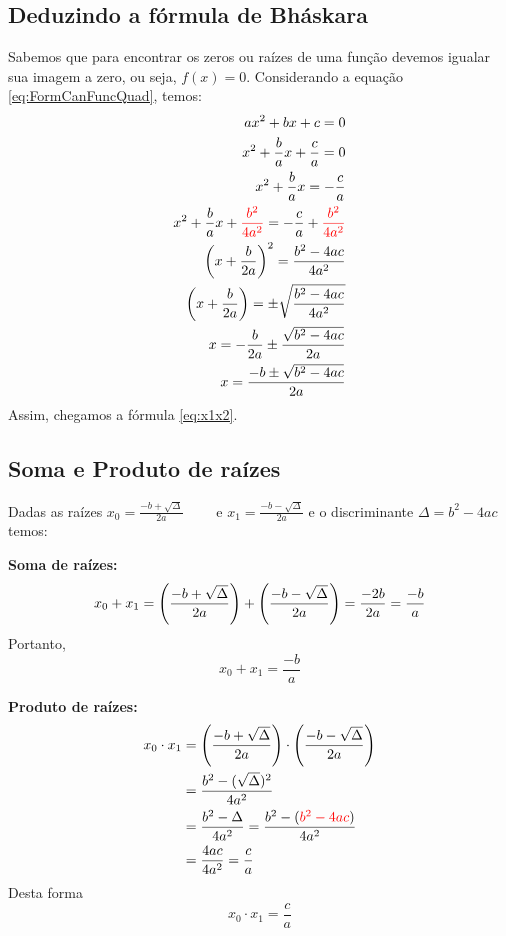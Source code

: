 \documentclass[../main.tex]{subfiles}
\begin{document}
\subsection{Deduzindo a fórmula de Bháskara}\label{subsec:FuncQuad-FormBhaskara}

Sabemos que para encontrar os zeros ou raízes de uma função devemos igualar sua imagem a zero, ou seja, $f(x)=0$. Considerando a equação \ref{eq:FormCanFuncQuad}, temos:
\begin{equation*}
\begin{aligned}
    ax^2+bx+c=0\\
    x^2+\frac{b}{a}x+\frac{c}{a}=0\\
    x^2+\frac{b}{a}x=-\frac{c}{a}\\
    x^2+\frac{b}{a}x+{\color{red}{\frac{b^2}{4a^2}}}=-\frac{c}{a}+{\color{red}{\frac{b^2}{4a^2}}}\\
    \left(x+\frac{b}{2a}\right)^2=\frac{b^2-4ac}{4a^2}\\
    \left(x+\frac{b}{2a}\right)=\pm\sqrt{\frac{b^2-4ac}{4a^2}}\\
      x=-\frac{b}{2a}\pm\frac{\sqrt{b^2-4ac}}{2a}\\
  x=\frac{-b\pm \sqrt{b^2-4ac}}{2a}
\end{aligned}
\end{equation*}
Assim, chegamos a fórmula \ref{eq:x1x2}.
\subsection{Soma e Produto de raízes}\label{subsec:FuncQuad-Soma&Produto}
Dadas as raízes $  x_0=\frac{-b+\sqrt{\Delta}}{2a}\qquad \textrm{ e } x_1=\frac{-b-\sqrt{\Delta}}{2a}$ e o discriminante $\Delta=b^2-4ac$ temos:
\begin{compactenum}[(i)]
\item \textbf{Soma de raízes:} $$x_0+x_1=\left(\frac{-b+\sqrt{\Delta}}{2a}\right)+\left(\frac{-b-\sqrt{\Delta}}{2a}\right)=\frac{-2b}{2a}=\frac{-b}{a}$$
Portanto, 
\begin{equation}
    x_0+x_1=\frac{-b}{a}\label{SomRaizes}
\end{equation}
\item \textbf{Produto de raízes:}
\begin{align*}
    x_0\cdot x_1&=\left(\frac{-b+\sqrt{\Delta}}{2a}\right)\cdot\left(\frac{-b-\sqrt{\Delta}}{2a}\right)\\
   & =\frac{b^2-(\sqrt{\Delta})^2}{4a^2}\\
   &=\frac{b^2-\Delta}{4a^2}=\frac{b^2-({\color{red}{b^2-4ac}})}{4a^2}\\
   &=\frac{4ac}{4a^2}=\frac{c}{a}
\end{align*}
Desta forma 
\begin{equation}
    x_0\cdot x_1=\frac{c}{a}\label{ProdRaizes}
\end{equation}
\end{compactenum}
\end{document}
